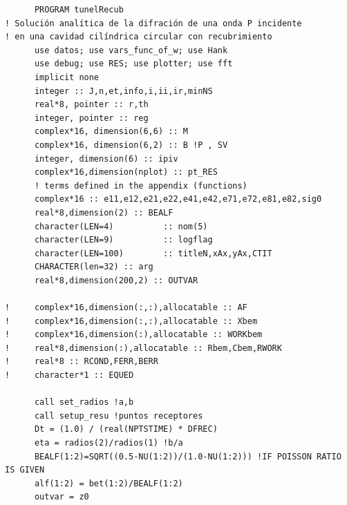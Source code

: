\documentclass [11pt,spanish]{article}
\begin{document}
\begingroup
\fontsize{10pt}{12pt}
\selectfont
{}
\begin{shaded}
\begin{verbatim}
      PROGRAM tunelRecub
! Solución analítica de la difración de una onda P incidente 
! en una cavidad cilíndrica circular con recubrimiento
      use datos; use vars_func_of_w; use Hank
      use debug; use RES; use plotter; use fft
      implicit none
      integer :: J,n,et,info,i,ii,ir,minNS
      real*8, pointer :: r,th
      integer, pointer :: reg
      complex*16, dimension(6,6) :: M
      complex*16, dimension(6,2) :: B !P , SV
      integer, dimension(6) :: ipiv 
      complex*16,dimension(nplot) :: pt_RES
      ! terms defined in the appendix (functions)
      complex*16 :: e11,e12,e21,e22,e41,e42,e71,e72,e81,e82,sig0
      real*8,dimension(2) :: BEALF
      character(LEN=4)          :: nom(5)
      character(LEN=9)          :: logflag
      character(LEN=100)        :: titleN,xAx,yAx,CTIT 
      CHARACTER(len=32) :: arg
      real*8,dimension(200,2) :: OUTVAR
      
!     complex*16,dimension(:,:),allocatable :: AF
!     complex*16,dimension(:,:),allocatable :: Xbem
!     complex*16,dimension(:),allocatable :: WORKbem
!     real*8,dimension(:),allocatable :: Rbem,Cbem,RWORK
!     real*8 :: RCOND,FERR,BERR
!     character*1 :: EQUED
      
      call set_radios !a,b
      call setup_resu !puntos receptores
      Dt = (1.0) / (real(NPTSTIME) * DFREC)
      eta = radios(2)/radios(1) !b/a
      BEALF(1:2)=SQRT((0.5-NU(1:2))/(1.0-NU(1:2))) !IF POISSON RATIO IS GIVEN
      alf(1:2) = bet(1:2)/BEALF(1:2)
      outvar = z0
\end{verbatim}
\end{shaded}
\endgroup
\end{document}
